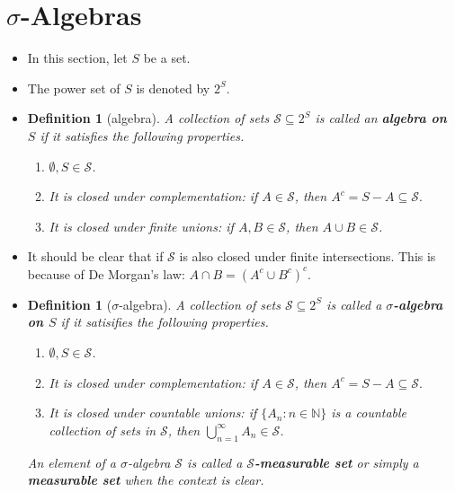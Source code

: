 \documentclass[10pt]{article}
\newtheorem{definition}[lemma]{Definition}
\numberwithin{lemma}{section}
\newcommand{\mcal}[1]{\mathcal{#1}}
\newcommand{\Nat}{\mathbb{N}}
\begin{document}
\section{$\sigma$-Algebras}

\begin{itemize}
  \item In this section, let $S$ be a set. 
  
  \item The power set of $S$ is denoted by $2^S$.
  
  \item \begin{definition}[algebra] \label{def:algebra}
    A collection of sets $\mcal{S} \subseteq 2^S$ is called an {\bf algebra on $S$} if it satisfies the following properties.
    \begin{enumerate}
      \item $\emptyset, S \in \mcal{S}$.
      \item It is closed under complementation: if $A \in \mcal{S}$, then $A^c = S-A \subseteq \mcal{S}.$
      \item It is closed under finite unions: if $A, B \in \mcal{S}$, then $A \cup B \in \mcal{S}$.
    \end{enumerate}
  \end{definition}

  \item It should be clear that if $\mcal{S}$ is also closed under finite intersections. This is because of De Morgan's law: $A \cap B = (A^c \cup B^c)^c$.

  \item \begin{definition}[$\sigma$-algebra]
    A collection of sets $\mcal{S} \subseteq 2^S$ is called a {\bf $\sigma$-algebra on $S$} if it satisifies the following properties.
    \begin{enumerate}
      \item $\emptyset, S \in \mcal{S}$.
      \item It is closed under complementation: if $A \in \mcal{S}$, then $A^c = S-A \subseteq \mcal{S}.$
      \item It is closed under countable unions: if $\{A_n : n \in \Nat \}$ is a countable collection of sets in $\mcal{S}$, then $\bigcup_{n=1}^\infty A_n \in \mcal{S}$.
    \end{enumerate}
    An element of a $\sigma$-algebra $\mcal{S}$ is called a {\bf $\mcal{S}$-measurable set} or simply a {\bf measurable set} when the context is clear.
  \end{definition}


\end{itemize}
\end{document}
